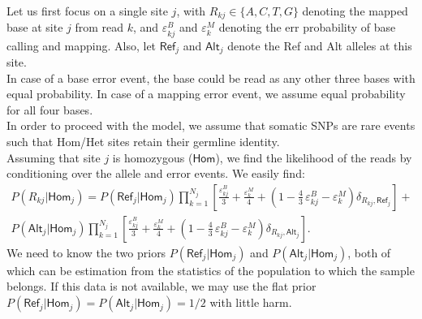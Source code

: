 \documentclass[nofootinbib,amssymb,amsmath]{revtex4}
\newcommand{\HOM}{$\mathsf{Hom}$}
\newcommand{\epss}{\varepsilon}
\begin{document}
 Let us first focus on a single site $j$, with $R_{kj} \in \{A, C, T, G\}$ denoting the mapped base at site $j$ from read $k$, and $\varepsilon^B_{kj}$ and $\varepsilon^M_k$ denoting the err probability of base calling and mapping. Also, let $\mathsf{Ref}_j$ and $\mathsf{Alt}_j$ denote the Ref and Alt alleles at this site.\\

 In case of a base error event, the base could be read as any other three bases with equal probability. In case of a mapping error event, we assume equal probability for all four bases.\\

 In order to proceed with the model, we assume that somatic SNPs are rare events such that Hom/Het sites retain their germline identity.\\

\noindent{\bf Likelihood of \HOM$_j$:} Assuming that site $j$ is homozygous (\HOM), we find the likelihood of the reads by conditioning over the allele and error events. We easily find:
\begin{multline}
P(R_{kj}|\mathsf{Hom}_j) = P(\mathsf{Ref}_j|\mathsf{Hom}_j)\prod_{k=1}^{N_j}\left[\frac{\epss^B_{kj}}{3} + \frac{\epss^M_{k}}{4} + \left(1 - \frac{4}{3}\,\epss^B_{kj} - \epss^M_k\right)\delta_{R_{kj}, \mathsf{Ref}_j}\right] +\\
P(\mathsf{Alt}_j|\mathsf{Hom}_j)\prod_{k=1}^{N_j}\left[\frac{\epss^B_{kj}}{3} + \frac{\epss^M_{k}}{4} + \left(1 - \frac{4}{3}\,\epss^B_{kj} - \epss^M_k\right)\delta_{R_{kj}, \mathsf{Alt}_j}\right].
\end{multline}
We need to know the two priors $P(\mathsf{Ref}_j|\mathsf{Hom}_j)$ and $P(\mathsf{Alt}_j|\mathsf{Hom}_j)$, both of which can be estimation from the statistics of the population to which the sample belongs. If this data is not available, we may use the flat prior $P(\mathsf{Ref}_j|\mathsf{Hom}_j) = P(\mathsf{Alt}_j|\mathsf{Hom}_j) = 1/2$ with little harm. \\
\end{document}
